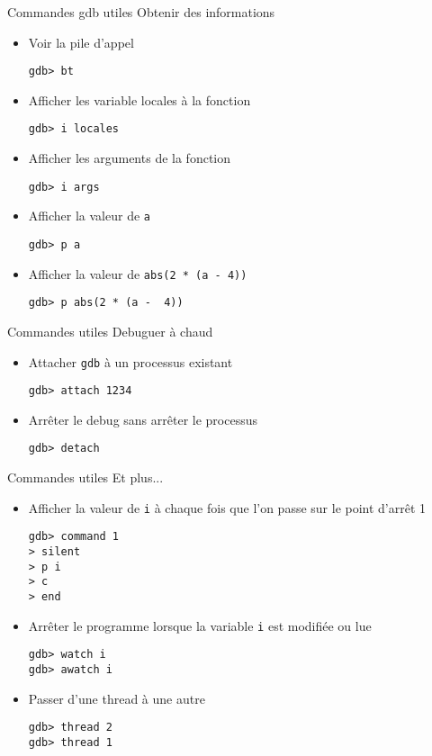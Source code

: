 \begin{frame}[fragile=singleslide]{Commandes gdb utiles}
  Obtenir des informations
  \begin{itemize}
  \item Voir la pile d'appel
    \begin{lstlisting}
gdb> bt
    \end{lstlisting}
  \item Afficher les variable locales à la fonction
    \begin{lstlisting}
gdb> i locales
    \end{lstlisting}
  \item Afficher les arguments de la fonction
    \begin{lstlisting}
gdb> i args
    \end{lstlisting}
  \item Afficher la valeur de \verb+a+
    \begin{lstlisting}
gdb> p a
    \end{lstlisting}
  \item Afficher la valeur de \verb+abs(2 * (a - 4))+
    \begin{lstlisting}
gdb> p abs(2 * (a -  4))
    \end{lstlisting}
  \end{itemize}
\end{frame}

\begin{frame}[fragile=singleslide]{Commandes utiles}
  Debuguer à chaud
  \begin{itemize}
  \item Attacher \verb+gdb+ à un processus existant
    \begin{lstlisting}
gdb> attach 1234
    \end{lstlisting}
  \item Arrêter le debug sans arrêter le processus
    \begin{lstlisting}
gdb> detach
     \end{lstlisting}
   \end{itemize}
\end{frame}

\begin{frame}[fragile=singleslide]{Commandes utiles}
  Et plus...
  \begin{itemize}
  \item Afficher  la valeur de \verb+i+  à chaque fois  que l'on passe
    sur le point d'arrêt 1
    \begin{lstlisting}
gdb> command 1
> silent
> p i
> c
> end
    \end{lstlisting}
  \item Arrêter le programme lorsque la variable \verb+i+ est modifiée
    ou lue
    \begin{lstlisting}
gdb> watch i
gdb> awatch i
      \end{lstlisting}
    \item Passer d'une thread à une autre
      \begin{lstlisting}
gdb> thread 2
gdb> thread 1
      \end{lstlisting}
    \end{itemize}
\end{frame}

